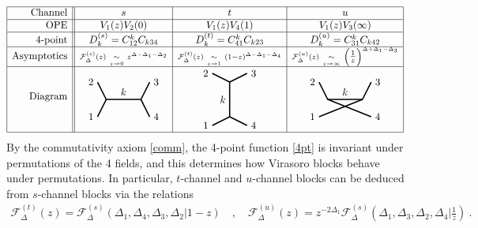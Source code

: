 \documentclass[12pt, a4paper]{article}
\begin{document}
\begin{align}
 \begin{array}{|r||c|c|c|}
  \hline 
  \text{Channel} & s & t & u
  \\ \hline
  \text{OPE} & V_1(z)V_2(0) & V_1(z)V_4(1) & V_1(z)V_3(\infty)
  \\ \hline 
  \text{4-point} & D^{(s)}_k = C_{12}^k C_{k34} & D^{(t)}_k = C_{41}^k C_{k23} & D^{(u)}_k = C_{31}^k C_{k42}
\\ \hline 
  \text{Asymptotics} & {\scriptstyle \mathcal{F}^{(s)}_{\Delta}(z)\ \underset{z\to 0}{\sim}\ z^{\Delta-\Delta_1-\Delta_2}} & {\scriptstyle\mathcal{F}^{(t)}_{\Delta}(z)\ \underset{z\to 1}{\sim}\ (1-z)^{\Delta-\Delta_1-\Delta_4}}
  & {\scriptstyle\mathcal{F}^{(u)}_\Delta(z)\  \underset{z\to \infty}{\sim}\ \left(\tfrac{1}{z}\right)^{\Delta+\Delta_1-\Delta_3}}
  \\
  \hline 
\text{Diagram} & 
\begin{tikzpicture}[baseline=(current  bounding  box.center), very thick, scale = .3]
\draw (-1,2) node [left] {$2$} -- (0,0) -- node [above] {$k$} (4,0) -- (5,2) node [right] {$3$};
\draw (-1,-2) node [left] {$1$} -- (0,0);
\draw (4,0) -- (5,-2) node [right] {$4$};
\end{tikzpicture}
& 
\begin{tikzpicture}[baseline=(current  bounding  box.center), very thick, scale = .3]
 \draw (-2,3) node [left] {$2$} -- (0,2) -- node [left] {$k$} (0,-2) -- (-2, -3) node [left] {$1$};
\draw (0,2) -- (2,3) node [right] {$3$};
\draw (0,-2) -- (2, -3) node [right] {$4$};
\end{tikzpicture}
& 
\begin{tikzpicture}[baseline=(current  bounding  box.center), very thick, scale = .3]
\draw (-1,2) node [left] {$2$} -- (0,0) -- node [above] {$k$} (4,0) -- (5,2) node [right] {$3$};
\draw (-1,-2) node [left] {$1$} -- (4,0);
\draw (0,0) -- (5,-2) node [right] {$4$};
\end{tikzpicture}
  \\
  \hline 
 \end{array}
 \label{stu}
\end{align}
By the commutativity axiom \eqref{comm}, the 4-point function \eqref{4pt} is invariant under permutations of the 4 fields, and this determines how Virasoro blocks behave under permutations. In particular, $t$-channel and $u$-channel blocks can be deduced from $s$-channel blocks via the relations
\begin{align}
 \mathcal{F}^{(t)}_\Delta(z) = \mathcal{F}^{(s)}_\Delta(\Delta_1,\Delta_4,\Delta_3,\Delta_2|1-z) \quad , \quad 
 \mathcal{F}^{(u)}_\Delta(z) = z^{-2\Delta_1}\mathcal{F}^{(s)}_\Delta(\Delta_1,\Delta_3,\Delta_2,\Delta_4|\tfrac{1}{z})\ .
 \label{stotu}
\end{align}
\end{document}
